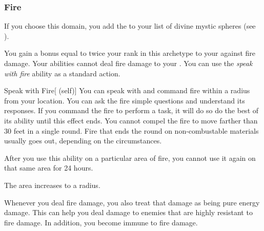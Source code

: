         \subsubsection{Fire}
            If you choose this domain, you add the   to your list of divine mystic spheres (see ).

             You gain a bonus equal to twice your rank in this archetype to your  against fire damage.
             Your abilities cannot deal fire damage to your .
             You can use the \textit{speak with fire} ability as a standard action.
            \begin{attuneability}{Speak with Fire}[ (self)]
                You can speak with and command fire within a \areahuge radius  from your location.
                You can ask the fire simple questions and understand its responses.
                If you command the fire to perform a task, it will do so do the best of its ability until this effect ends.
                You cannot compel the fire to move farther than 30 feet in a single round.
                Fire that ends the round on non-combustable materials usually goes out, depending on the circumstances.

                After you use this ability on a particular area of fire, you cannot use it again on that same area for 24 hours.

                \rankline
                 The area increases to a \areagarg radius.
            \end{attuneability}
             Whenever you deal fire damage, you also treat that damage as being pure energy damage.
            This can help you deal damage to enemies that are highly resistant to fire damage.
            In addition, you become immune to fire damage.


